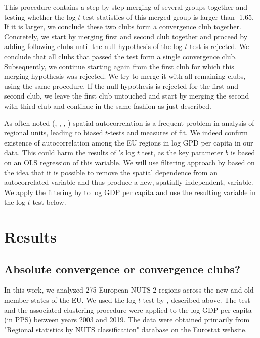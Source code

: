\documentclass[11pt]{article}
\begin{document}
This procedure contains a step by step merging of several groups together and testing whether the log $t$ test statistics of this merged group is larger than -1.65. If it is larger, we conclude these two clubs form a convergence club together. Concretely, we start by merging first and second club together and proceed by adding following clubs until the null hypothesis of the log $t$ test is rejected. We conclude that all clubs that passed the test form a single convergence club. Subsequently, we continue starting again from the first club for which this merging hypothesis was rejected. We try to merge it with all remaining clubs, using the same procedure. If the null hypothesis is rejected for the first and second club, we leave the first club untouched and start by merging the second with third club and continue in the same fashion as just described.

As often noted (\citet{dall2008regional}, \citet{magrini2004regional}, \citet{anselin1991properties}, \citet{anselin2001spatial}) spatial autocorrelation is a frequent problem in analysis of regional units, leading to biased $t$-tests and measures of fit. We indeed confirm existence of autocorrelation among the EU regions in log GPD per capita in our data. This could harm the results of \citeauthor{phillips2007transition}'s log $t$ test, as the key parameter $b$ is based on an OLS regression of this variable. We will use filtering approach by \cite{getis2002comparative} based on the idea that it is possible to remove the spatial dependence from an autocorrelated variable and thus produce a new, spatially independent, variable. We apply the filtering by \cite{getis2002comparative} to log GDP per capita and use the resulting variable in the log $t$ test below.



\section{Results}
\subsection{Absolute convergence or convergence clubs?}
In this work, we analyzed 275 European NUTS 2 regions across the new and old member states of the EU. We used the log $t$ test by \citet{phillips2009economic}, described above. The test and the associated clustering procedure were applied to the log GDP per capita (in PPS) between years 2003 and 2019. The data were obtained primarily from "Regional statistics by NUTS classification" database on the Eurostat website.
\end{document}
